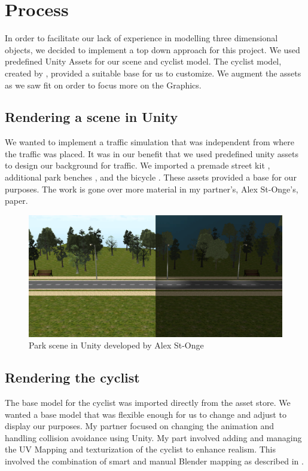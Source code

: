 \documentclass{scrartcl}
\begin{document}
\section{Process}

In order to facilitate our lack of experience in modelling three dimensional objects, we decided to implement a top down approach for this project.  We used predefined Unity Assets for our scene and cyclist model.  The cyclist model, created by \citep{Bicycle:Blender}, provided a suitable base for us to customize.  We augment the assets as we saw fit on order to focus more on the Graphics.

    \subsection{Rendering a scene in Unity}
        We wanted to implement a traffic simulation that was independent from where the traffic was placed.  It was in our benefit that we used predefined unity assets to design 	our background for traffic.  We imported a premade street kit \citep{Street:Jankowski}, additional park benches \citep{Parkchair:Universal}, and the bicycle \citep{Bicycle:Blender}.  These assets provided a base for our purposes.  The work is gone over more material in my partner's, Alex St-Onge's, paper.
    		
        \begin{figure}[h] 
        \includegraphics[width=\textwidth]{parkDayNight} 
        \caption{Park scene in Unity developed by Alex St-Onge} 
        \label{fig:park_scene} 
        \end{figure}
		
    \subsection{Rendering the cyclist} 
    
The  base model for the cyclist was imported directly from the asset store.  We wanted a base model that was flexible enough for us to change and adjust to display our purposes.  My partner focused on changing the animation and handling collision avoidance using Unity.  My part involved adding and managing the UV Mapping and texturization of the cyclist to enhance realism.  This involved the combination of smart and manual Blender mapping as described in \cite{UVMap}.  
\end{document}
